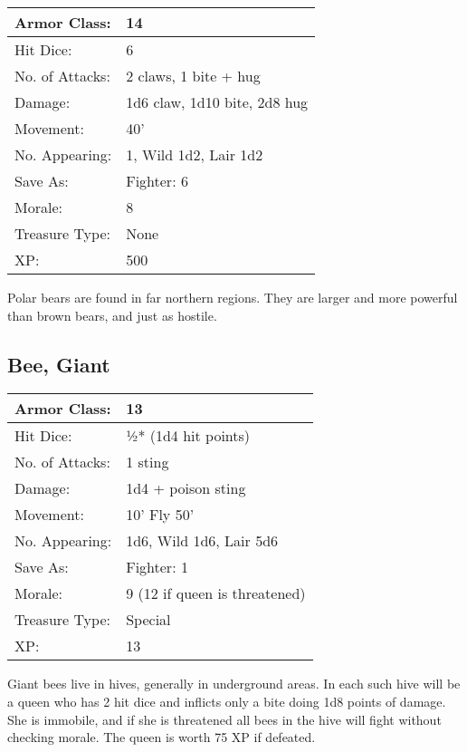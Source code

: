 \documentclass[a4paper,twoside,openany,10pt]{book}
\begin{document}
\begin{multicols}{2}
\begin{tabularx}{0.48\textwidth}{@{}lX@{}}
Armor Class: & 14 \\\hline
Hit Dice: & 6 \\\hline
No. of Attacks: & 2 claws, 1 bite + hug \\\hline
Damage: & 1d6 claw, 1d10 bite, 2d8 hug \\\hline
Movement: & 40' \\\hline
No. Appearing: & 1, Wild 1d2, Lair 1d2 \\\hline
Save As: & Fighter: 6 \\\hline
Morale: & 8 \\\hline
Treasure Type: & None \\\hline
XP: & 500 \\\hline
\end{tabularx}



Polar bears are found in far northern regions. They are larger and more powerful than brown bears, and just as hostile.

\subsection*{Bee, Giant}\label{bee-giant}

\begin{tabularx}{0.48\textwidth}{@{}lX@{}}
Armor Class: & 13 \\\hline
Hit Dice: & ½* (1d4 hit points) \\\hline
No. of Attacks: & 1 sting \\\hline
Damage: & 1d4 + poison sting \\\hline
Movement: & 10' Fly 50' \\\hline
No. Appearing: & 1d6, Wild 1d6, Lair 5d6 \\\hline
Save As: & Fighter: 1 \\\hline
Morale: & 9 (12 if queen is threatened) \\\hline
Treasure Type: & Special \\\hline
XP: & 13 \\\hline
\end{tabularx}\medskip

Giant bees live in hives, generally in underground areas. In each such hive will be a queen who has 2 hit dice and inflicts only a bite doing 1d8 points of damage. She is immobile, and if she is threatened all bees in the hive will fight without checking morale. The queen is worth 75 XP if defeated.


\end{multicols}
\end{document}
